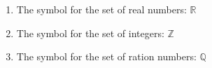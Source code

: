 \documentclass[11pt]{article}
\begin{document}
\begin{enumerate}
\item The symbol for the set of real numbers: $\mathbb{R}$
\item The symbol for the set of integers: $\mathbb{Z}$
\item The symbol for the set of ration numbers: $\mathbb{Q}$
\end{enumerate}
\end{document}
